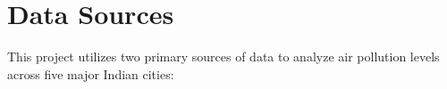 \documentclass[12pt]{article}
\begin{document}







\newpage




\section{Data Sources}

This project utilizes two primary sources of data to analyze air pollution levels across five major Indian cities:
\end{document}
